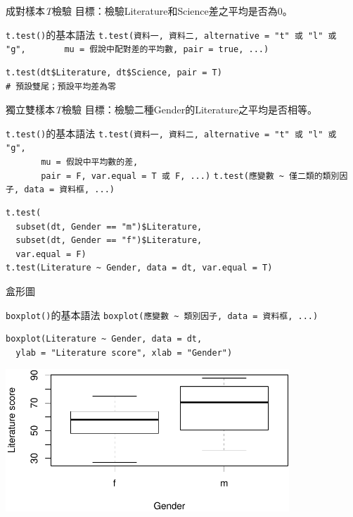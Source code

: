 \documentclass[12pt, aspectratio=43]{beamer}
\begin{document}
\begin{frame}[fragile]{成對樣本\emph{T}檢驗}
目標：檢驗Literature和Science差之平均是否為0。
\begin{block}{\texttt{t.test()}的基本語法}
\verb+t.test(資料一, 資料二, alternative = "t" 或 "l" 或 "g",+
\verb+       mu = 假說中配對差的平均數, pair = true, ...)+
\end{block}
\begin{verbatim}
t.test(dt$Literature, dt$Science, pair = T)
# 預設雙尾；預設平均差為零
\end{verbatim}
\end{frame}


\begin{frame}[fragile]{獨立雙樣本\emph{T}檢驗}
目標：檢驗二種Gender的Literature之平均是否相等。
\begin{block}{\texttt{t.test()}的基本語法}
\verb+t.test(資料一, 資料二, alternative = "t" 或 "l" 或 "g",+\\
\verb+       mu = 假說中平均數的差, +\\
\verb+       pair = F, var.equal = T 或 F, ...)+
\verb+t.test(應變數 ~ 僅二類的類別因子, data = 資料框, ...)+
\end{block}
\begin{verbatim}
t.test(
  subset(dt, Gender == "m")$Literature,
  subset(dt, Gender == "f")$Literature,
  var.equal = F)
t.test(Literature ~ Gender, data = dt, var.equal = T)
\end{verbatim}
\end{frame}


\begin{frame}[fragile]{盒形圖}

\begin{block}{\texttt{boxplot()}的基本語法}
\verb+boxplot(應變數 ~ 類別因子, data = 資料框, ...)+
\end{block}

\begin{verbatim}
boxplot(Literature ~ Gender, data = dt, 
  ylab = "Literature score", xlab = "Gender")
\end{verbatim}

\begin{center}
\includegraphics[width=0.8\textwidth]{Rplot-two-group.pdf}
\end{center}
\end{frame}
\end{document}
